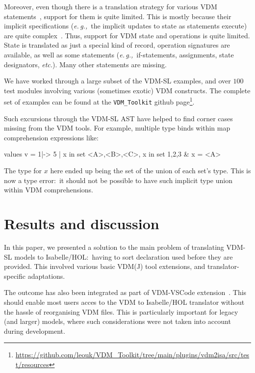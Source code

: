 \documentclass[runningheads,a4paper]{llncs}
\newcommand{\eg}{{\em e.\,g.,\/}}
\newcommand{\etc}{{\em etc.\/}}
\begin{document}
Moreover, even though there is a translation strategy for various VDM statements~\cite{NimFull}, support for them is quite limited. This is mostly because their implicit specifications (\eg~the implicit updates to state as statements execute) are quite complex~\cite{10.5555/3204179.3204224}. Thus, support for VDM state and operations is quite limited. State is translated as just a special kind of record, operation signatures are available, as well as some statements (\eg~if-statements, assignments, state designators, \etc). Many other statements are missing.      

We have worked through a large subset of the VDM-SL examples, and over \(100\) test modules involving various (sometimes exotic) VDM constructs. The complete set of examples can be found at the \texttt{VDM\_Toolkit} github page\footnote{\url{https://github.com/leouk/VDM_Toolkit/tree/main/plugins/vdm2isa/src/test/resources}}.

Such excursions through the VDM-SL AST have helped to find corner cases missing from the VDM tools. For example, multiple type binds within map comprehension expressions like:
% 
\begin{vdmsl}[frame=none,basicstyle=\ttfamily\scriptsize]
    values 
        v = { 1|-> 5 | x in set {<A>,<B>,<C>}, x in set {1,2,3} & x = <A> }
\end{vdmsl}
%
The type for \(x\) here ended up being the set of the union of each set's type. This is now a type error:~it should not be possible to have such implicit type union within VDM comprehensions. 

\section{Results and discussion}\label{sec:Results}

In this paper, we presented a solution to the main problem of translating VDM-SL models to Isabelle/HOL:~having to sort declaration used before they are provided. This involved various basic VDM(J) tool extensions, and  translator-specific adaptations. 

The outcome has also been integrated as part of VDM-VSCode extension~\cite{AdvancedVSCodePaper}. This should enable most users acces to the VDM to Isabelle/HOL translator without the hassle of reorganising VDM files. This is particularly important for legacy (and larger) models, where such considerations were not taken into account during development. 
\end{document}
